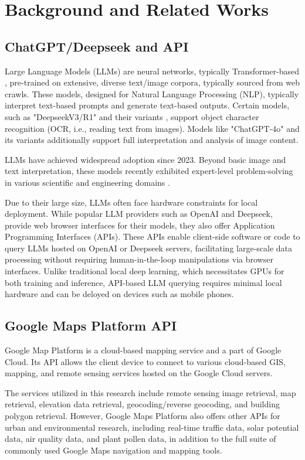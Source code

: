 \section{Background and Related Works}
\subsection{ChatGPT/Deepseek and API}
Large Language Models (LLMs) are neural networks, typically Transformer-based \cite{transformer}, pre-trained on extensive, diverse text/image corpora, typically sourced from web crawls. These models, designed for Natural Language Processing (NLP), typically interpret text-based prompts and generate text-based outputs. Certain models, such as "DeepseekV3/R1" and their variants \cite{deepseekv3, deepseekr1}, support object character recognition (OCR, i.e., reading text from images). Models like "ChatGPT-4o" \cite{gpt4} and its variants additionally support full interpretation and analysis of image content.

LLMs have achieved widespread adoption since 2023. Beyond basic image and text interpretation, these models recently exhibited expert-level problem-solving in various scientific and engineering domains \cite{gpqa, math500}.

Due to their large size, LLMs often face hardware constraints for local deployment. While popular LLM providers such as OpenAI and Deepseek, provide web browser interfaces for their models, they also offer Application Programming Interfaces (APIs). These APIs enable client-side software or code to query LLMs hosted on OpenAI or Deepseek servers, facilitating large-scale data processing without requiring human-in-the-loop manipulations via browser interfaces. Unlike traditional local deep learning, which necessitates GPUs for both training and inference, API-based LLM querying requires minimal local hardware and can be deloyed on devices such as mobile phones. 

\subsection{Google Maps Platform API}
Google Map Platform is a cloud-based mapping service and a part of Google Cloud. Its API allows the client device to connect to various cloud-based GIS, mapping, and remote sensing services hosted on the Google Cloud servers. 

The services utilized in this research include remote sensing image retrieval, map retrieval, elevation data retrieval, geocoding/reverse geocoding, and building polygon retrieval. However, Google Maps Platform also offers other APIs for urban and environmental research, including real-time traffic data, solar potential data, air quality data, and plant pollen data, in addition to the full suite of commonly used Google Maps navigation and mapping tools. 

